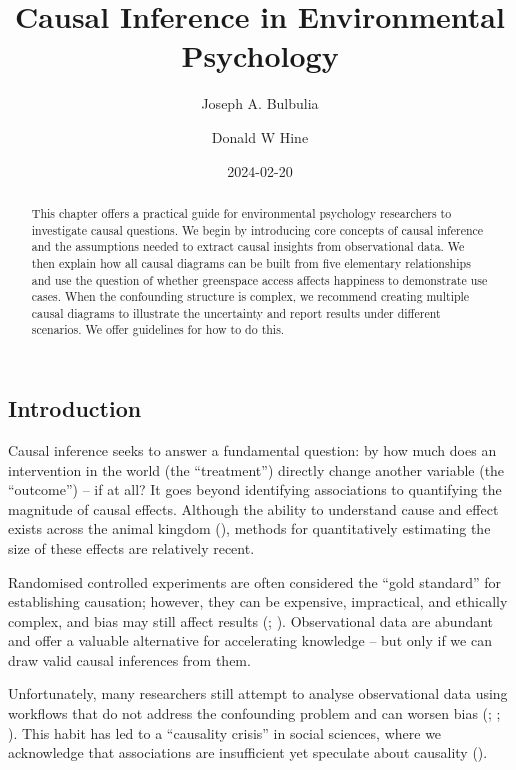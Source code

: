 \documentclass[
  singlecolumn]{article}
\title{Causal Inference in Environmental Psychology}
\author{Joseph A. Bulbulia \and Donald W Hine}
\date{2024-02-20}
\begin{document}
\maketitle
\begin{abstract}
This chapter offers a practical guide for environmental psychology
researchers to investigate causal questions. We begin by introducing
core concepts of causal inference and the assumptions needed to extract
causal insights from observational data. We then explain how all causal
diagrams can be built from five elementary relationships and use the
question of whether greenspace access affects happiness to demonstrate
use cases. When the confounding structure is complex, we recommend
creating multiple causal diagrams to illustrate the uncertainty and
report results under different scenarios. We offer guidelines for how to
do this.
\end{abstract}

\subsection{Introduction}\label{introduction}

Causal inference seeks to answer a fundamental question: by how much
does an intervention in the world (the ``treatment'') directly change
another variable (the ``outcome'') -- if at all? It goes beyond
identifying associations to quantifying the magnitude of causal effects.
Although the ability to understand cause and effect exists across the
animal kingdom (),
methods for quantitatively estimating the size of these effects are
relatively recent.

Randomised controlled experiments are often considered the ``gold
standard'' for establishing causation; however, they can be expensive,
impractical, and ethically complex, and bias may still affect results
(;
).
Observational data are abundant and offer a valuable alternative for
accelerating knowledge -- but only if we can draw valid causal
inferences from them.

Unfortunately, many researchers still attempt to analyse observational
data using workflows that do not address the confounding problem and can
worsen bias (;
;
). This habit
has led to a ``causality crisis'' in social sciences, where we
acknowledge that associations are insufficient yet speculate about
causality ().
\end{document}

